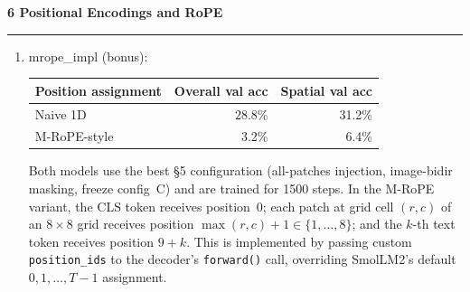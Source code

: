 \documentclass[11pt]{article}
\newenvironment{question}[1]
    {
        \begin{center}
        \textbf{#1} \rmfamily
        \bigskip
        \hrule
    }
    {
        \end{center}
    }
\begin{document}
\begin{question}{6 Positional Encodings and RoPE}
\begin{enumerate}[label=\textbf{\arabic*.}]
    \textbf{(3) Why three chunks rather than two?}
    M-RoPE splits the attention head dimension into three equal chunks, one
    rotated by $t$, one by $h$, and one by $w$.
    If the temporal index $t$ were dropped and only $(h,w)$ were used, text
    tokens would have no natural $(h,w)$ coordinates: they form a 1D sequence,
    so one common assignment is $(h=i,\, w=i)$ for the $i$-th text token.
    But this conflates the text's sequential distance with spatial image
    distance: the relative $(h,w)$ offset between text token $i$ and patch
    $(r,c)$ would be $(i-r,\, i-c)$, a direction that mixes image rows/columns
    with text token indices in a semantically meaningless way.
    The temporal index provides a dedicated channel where text tokens can track
    their sequential order independently of image coordinates, while image tokens
    share a fixed $t=0$ that keeps them distinguishable from all text tokens in
    at least one dimension.

    \item mrope\_impl (bonus):

    \begin{center}
    \begin{tabular}{lrr}
    \toprule
    Position assignment & Overall val acc & Spatial val acc \\
    \midrule
    Naive 1D            & 28.8\% & 31.2\% \\
    M-RoPE-style        &  3.2\% &  6.4\% \\
    \bottomrule
    \end{tabular}
    \end{center}

    Both models use the best §5 configuration (all-patches injection,
    image-bidir masking, freeze config~C) and are trained for 1500 steps.
    In the M-RoPE variant, the CLS token receives position~0; each patch at
    grid cell $(r,c)$ of an $8\times8$ grid receives position
    $\max(r,c)+1 \in \{1,\ldots,8\}$; and the $k$-th text token receives
    position $9+k$.
    This is implemented by passing custom \texttt{position\_ids} to the
    decoder's \texttt{forward()} call, overriding SmolLM2's default
    $0,1,\ldots,T{-}1$ assignment.


\end{enumerate}
\end{question}
\end{document}
